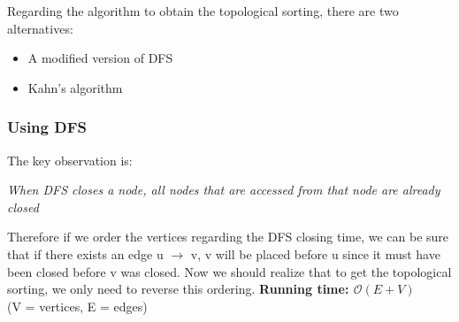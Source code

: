 \begin{figure}[h!]
\centering
\begin{subfigure}[]{0.6\textwidth}
\begin{center}
		
\end{center}
\end{subfigure}
\begin{subfigure}[]{0.35\textwidth}
\begin{center}
\end{center}
\end{subfigure}


\end{figure}

Regarding the algorithm to obtain the topological sorting, there 
are two alternatives:
\begin{itemize}
		\setlength{\itemsep}{0pt}
		\item A modified version of DFS 
		\item Kahn's algorithm
\end{itemize}
\newpage
\subsubsection*{Using DFS}
The key observation is:
\begin{center}
		\itshape
		When DFS closes a node, all nodes that are accessed from
		that node are already closed
\end{center}
Therefore if we order the vertices regarding the DFS closing time, we can be 
sure that if there exists an edge u $\rightarrow$ v, v will be placed before
u since it must have been closed before v was closed. Now we should
realize that to get the topological sorting, we only need to reverse
this ordering.
\noindent \textbf{\boldmath Running time: $\mathcal{O}(E+V)$}
\\ {\small(V = vertices, E = edges)}
\clearpage
